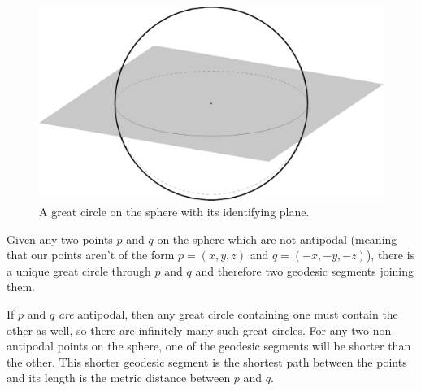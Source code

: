 {
\ifsmallfigs
\else
\begin{figure}[htb]
	\centering
	\includegraphics[width=.5\textwidth]{figs/sph-1pl.pdf}
	\caption{A great circle on the sphere with its identifying plane.}
	\label{fig:sphereline}
\end{figure}
\fi
}



\begin{observation}
	Given any two points $p$ and $q$ on the sphere which are not antipodal (meaning that our points aren't of the form $p=(x,y,z)$ and $q=(-x,-y,-z)$), there is a unique great circle through $p$ and $q$ and therefore two geodesic segments joining them. 
\end{observation}
If $p$ and $q$ \textit{are} antipodal, then any great circle containing one must contain the other as well, so there are infinitely many such great circles. For any two non-antipodal points on the sphere, one of the geodesic segments will be shorter than the other.  {This shorter geodesic segment is the shortest path between the points and its length is the metric distance between $p$ and $q$}.

